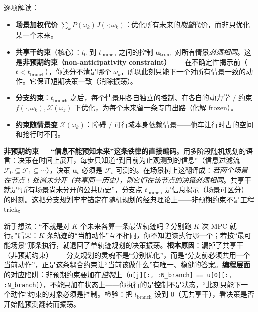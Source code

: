 逐项解读：
\begin{itemize}
  \item \textbf{场景加权代价} $\sum_k P(\omega_k) J(\cdot;\omega_k)$：优化所有未来的\emph{期望}代价，而非只优化某一个未来。
  \item \textbf{共享干约束}（核心）：$t_0$ 到 $t_{\mathrm{branch}}$ 之间的控制 $\mathbf{u}_{\mathrm{trunk}}$ 对所有情景\emph{必须相同}。这是\textbf{非预期约束（non-anticipativity constraint）}——在不确定性揭示前（$t<t_{\mathrm{branch}}$），你还分不清是哪个 $\omega_k$，所以此刻只能下一个对所有情景一致的动作。它保证短期决策一致（消除振荡）。
  \item \textbf{分支约束}：$t_{\mathrm{branch}}$ 之后，每个情景用各自独立的控制、在各自的动力学 / 约束 $f(\cdot,\omega_k),\mathcal{X}(\omega_k)$ 下优化，为每个未来留一条专门出路（化解 frozen）。
  \item \textbf{约束随情景变} $\mathcal{X}(\omega_k)$：障碍 / 可行域本身依赖情景——他车让行时占的空间和抢行时不同。
\end{itemize}

\begin{insight}
\textbf{非预期约束 = “信息不能预知未来”这条铁律的直接编码}。用多阶段随机规划的语言：决策在时间上展开，每步只知道“到目前为止观测到的信息”（信息过滤流 $\mathcal{F}_0\subseteq\mathcal{F}_1\subseteq\cdots$），决策 $\mathbf{u}_t$ 必须是 $\mathcal{F}_t$-可测的。在场景树上这翻译成：\emph{若两个场景在节点 $t$ 处尚未分开（共享同一历史），则它们在该节点的决策必须相同}。共享干就是“所有场景尚未分开的公共历史”，分支点 $t_{\mathrm{branch}}$ 是信息揭示（场景可区分）的时刻。这把分支规划牢牢锚定在随机规划的经典理论上——非预期约束不是工程 trick。
\end{insight}

\begin{pitfall}
新手想法：“不就是对 $K$ 个未来各算一条最优轨迹吗？分别跑 $K$ 次 MPC 就行。”后果：$K$ 条轨迹的“当前动作”互不相同，你不知道该执行哪一个；若按“最可能场景”那条执行，就退回了单轨迹规划的决策振荡。\textbf{根本原因}：漏掉了共享干（非预期约束）——分支规划的灵魂不是“分别优化”，而是“分支前必须共用一个当前动作”，正是这条耦合约束让“当前该做什么”有唯一、稳健的答案。\textbf{编程层面}的对应陷阱：非预期约束要加在\emph{控制}上（\verb|u[j][:, :N_branch] == u[0][:, :N_branch]|），不能只加在状态上——你执行的是控制不是状态，“此刻只能下一个动作”约束的对象必须是控制。检验：把 $t_{\mathrm{branch}}$ 设到 $0$（无共享干），看决策是否开始随预测翻转而振荡。
\end{pitfall}

